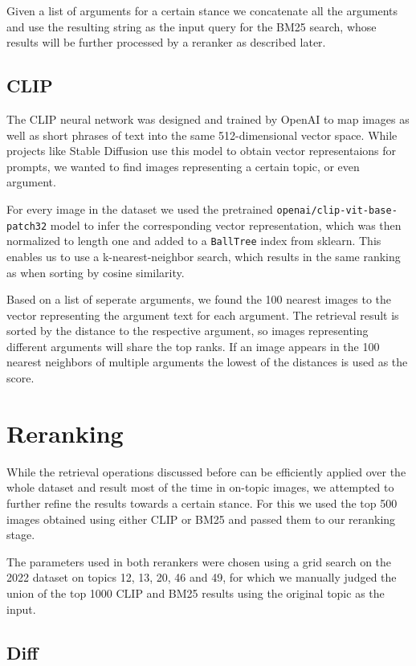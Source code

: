 \documentclass[
]{ceurart}
\begin{document}
Given a list of arguments for a certain stance we concatenate all the arguments and use the resulting string as the input query for the BM25 search, whose results will be further processed by a reranker as described later.

\subsection{CLIP}

The CLIP \cite{radford2021learning} neural network was designed and trained by OpenAI to map images as well as short phrases of text into the same 512-dimensional vector space. While projects like Stable Diffusion use this model to obtain vector representaions for prompts, we wanted to find images representing a certain topic, or even argument.

For every image in the dataset we used the pretrained \texttt{openai/clip-vit-base-patch32} model to infer the corresponding vector representation, which was then normalized to length one and added to a \texttt{BallTree} index from sklearn. This enables us to use a k-nearest-neighbor search, which results in the same ranking as when sorting by cosine similarity.

Based on a list of seperate arguments, we found the 100 nearest images to the vector representing the argument text for each argument. The retrieval result is sorted by the distance to the respective argument, so images representing different arguments will share the top ranks. If an image appears in the 100 nearest neighbors of multiple arguments the lowest of the distances is used as the score.

\section{Reranking}

While the retrieval operations discussed before can be efficiently applied over the whole dataset and result most of the time in on-topic images, we attempted to further refine the results towards a certain stance. For this we used the top 500 images obtained using either CLIP or BM25 and passed them to our reranking stage.

The parameters used in both rerankers were chosen using a grid search on the 2022 dataset on topics 12, 13, 20, 46 and 49, for which we manually judged the union of the top 1000 CLIP and BM25 results using the original topic as the input.

\subsection{Diff}
\end{document}
